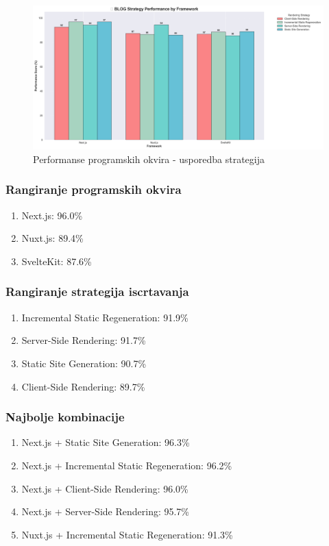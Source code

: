 \begin{figure}[H]
    \centering
    \includegraphics[width=\textwidth]{slike/rezultati/blog/blog_strategy_comparison.png}
    \caption{Performanse programskih okvira - usporedba strategija}
    \label{fig:testiranje-blog-usporedba-strategija}
\end{figure}

\subsubsection{Rangiranje programskih okvira}
\begin{enumerate}
    \item Next.js: 96.0\%
    \item Nuxt.js: 89.4\%
    \item SvelteKit: 87.6\%
\end{enumerate}

\subsubsection{Rangiranje strategija iscrtavanja}
\begin{enumerate}
    \item Incremental Static Regeneration: 91.9\%
    \item Server-Side Rendering: 91.7\%
    \item Static Site Generation: 90.7\%
    \item Client-Side Rendering: 89.7\%
\end{enumerate}

\subsubsection{Najbolje kombinacije}
\begin{enumerate}
    \item Next.js + Static Site Generation: 96.3\%
    \item Next.js + Incremental Static Regeneration: 96.2\%
    \item Next.js + Client-Side Rendering: 96.0\%
    \item Next.js + Server-Side Rendering: 95.7\%
    \item Nuxt.js + Incremental Static Regeneration: 91.3\%
\end{enumerate}

